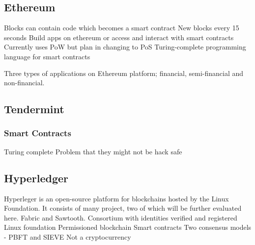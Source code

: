 \subsection{Ethereum}
Blocks can contain code which becomes a smart contract
New blocks every 15 seconds
Build apps on ethereum or access and interact with smart contracts 
Currently uses PoW but plan in changing to PoS
Turing-complete programming language for smart contracts

Three types of applications on Ethereum platform; financial, semi-financial and non-financial. 
\subsection{Tendermint}
\subsubsection*{Smart Contracts}
Turing complete
Problem that they might not be hack safe 

\subsection{Hyperledger}
Hyperleger is an open-source platform for blockchains hosted by the Linux Foundation. It consists of many project, two of which will be further evaluated here. Fabric and Sawtooth. 
Consortium with identities verified and registered
Linux foundation
Permissioned blockchain
Smart contracts
Two consensus models - PBFT and SIEVE
Not a cryptocurrency 


